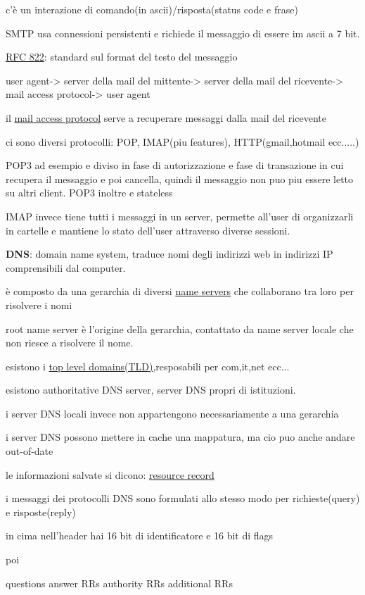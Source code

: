 \documentclass[12pt]{article}
\begin{document}
c'è un interazione di comando(in ascii)/risposta(status code e frase)


SMTP usa connessioni persistenti e richiede il messaggio di essere im ascii a 7 bit.

\underline{RFC 822}: standard sul format del testo del messaggio

user agent-> server della mail del mittente-> server della mail del ricevente-> mail access protocol-> user agent

il \underline{mail access protocol} serve a recuperare messaggi dalla mail del ricevente

ci sono diversi protocolli: POP, IMAP(piu features), HTTP(gmail,hotmail ecc.....)


POP3 ad esempio e diviso in fase di autorizzazione e fase di transazione in cui recupera il messaggio e poi cancella, quindi il messaggio non puo piu essere letto su altri client.
POP3 inoltre e stateless

IMAP invece tiene tutti i messaggi in un server, permette all'user di organizzarli in cartelle  e mantiene lo stato dell'user attraverso diverse sessioni.


\textbf{DNS}: domain name system, traduce nomi degli indirizzi web in indirizzi IP comprensibili dal computer.

è composto da una gerarchia di diversi \underline{name servers} che collaborano tra loro per risolvere i nomi

root name server è l'origine della gerarchia, contattato da name server locale che non riesce a risolvere il nome.

esistono i \underline{top level domains(TLD)},resposabili per com,it,net ecc...

esistono authoritative DNS server, server DNS propri di istituzioni.

i server DNS locali invece non appartengono necessariamente a una gerarchia

i server DNS possono mettere in cache una mappatura, ma cio puo anche andare out-of-date

le informazioni salvate si dicono: \underline{resource record}


i messaggi dei protocolli DNS sono formulati allo stesso modo per richieste(query) e risposte(reply)


in cima nell'header hai 16 bit di identificatore e 16 bit di flags

poi 

questions answer RRs
authority RRs additional RRs
\end{document}
